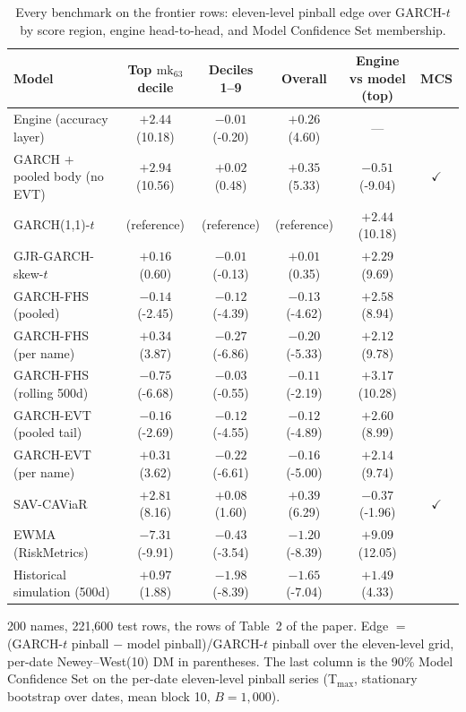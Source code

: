 \documentclass[11pt]{article}
\begin{document}
\begin{table}[htbp]
\centering
\begin{threeparttable}
\caption{Every benchmark on the frontier rows: eleven-level pinball edge over GARCH-$t$ by score region, engine head-to-head, and Model Confidence Set membership.}
\label{tab:bench-pinball}
\footnotesize
\begin{tabular}{lccccc}
\toprule
Model & Top $\mathrm{mk}_{63}$ decile & Deciles 1--9 & Overall & Engine vs model (top) & MCS \\
\midrule
Engine (accuracy layer) & $+2.44$ (10.18) & $-0.01$ (-0.20) & $+0.26$ (4.60) & --- &  \\
GARCH $+$ pooled body (no EVT) & $+2.94$ (10.56) & $+0.02$ (0.48) & $+0.35$ (5.33) & $-0.51$ (-9.04) & $\checkmark$ \\
GARCH(1,1)-$t$ & (reference) & (reference) & (reference) & $+2.44$ (10.18) &  \\
GJR-GARCH-skew-$t$ & $+0.16$ (0.60) & $-0.01$ (-0.13) & $+0.01$ (0.35) & $+2.29$ (9.69) &  \\
GARCH-FHS (pooled) & $-0.14$ (-2.45) & $-0.12$ (-4.39) & $-0.13$ (-4.62) & $+2.58$ (8.94) &  \\
GARCH-FHS (per name) & $+0.34$ (3.87) & $-0.27$ (-6.86) & $-0.20$ (-5.33) & $+2.12$ (9.78) &  \\
GARCH-FHS (rolling 500d) & $-0.75$ (-6.68) & $-0.03$ (-0.55) & $-0.11$ (-2.19) & $+3.17$ (10.28) &  \\
GARCH-EVT (pooled tail) & $-0.16$ (-2.69) & $-0.12$ (-4.55) & $-0.12$ (-4.89) & $+2.60$ (8.99) &  \\
GARCH-EVT (per name) & $+0.31$ (3.62) & $-0.22$ (-6.61) & $-0.16$ (-5.00) & $+2.14$ (9.74) &  \\
SAV-CAViaR & $+2.81$ (8.16) & $+0.08$ (1.60) & $+0.39$ (6.29) & $-0.37$ (-1.96) & $\checkmark$ \\
EWMA (RiskMetrics) & $-7.31$ (-9.91) & $-0.43$ (-3.54) & $-1.20$ (-8.39) & $+9.09$ (12.05) &  \\
Historical simulation (500d) & $+0.97$ (1.88) & $-1.98$ (-8.39) & $-1.65$ (-7.04) & $+1.49$ (4.33) &  \\
\bottomrule
\end{tabular}
\begin{tablenotes}\footnotesize
\item 200 names, 221,600 test rows, the rows of Table~2 of the paper. Edge $=$ (GARCH-$t$ pinball $-$ model pinball)/GARCH-$t$ pinball over the eleven-level grid, per-date Newey--West(10) DM in parentheses. The last column is the 90\% Model Confidence Set on the per-date eleven-level pinball series (T$_{\max}$, stationary bootstrap over dates, mean block 10, $B=1{,}000$).
\end{tablenotes}
\end{threeparttable}
\end{table}
\end{document}
